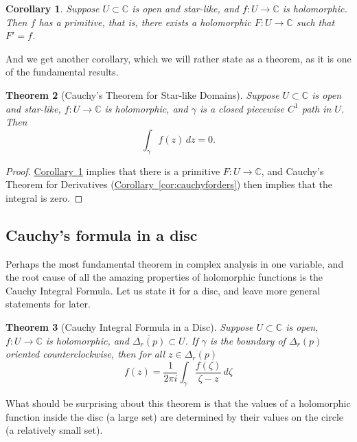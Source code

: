\documentclass[12pt,openany]{book}
\newcommand{\C}{{\mathbb{C}}}
\theoremstyle{plain}
\newtheorem{thm}{Theorem}[section]
\newtheorem{cor}[thm]{Corollary}
\theoremstyle{remark}
\theoremstyle{definition}
\theoremstyle{exercise}
\theoremstyle{example}
\newcommand{\corref}[1]{\hyperref[#1]{Corollary~\ref*{#1}}}
\begin{document}
\begin{cor} \label{cor:primitiveinstarlike}
Suppose $U \subset \C$ is open and star-like,
and $f \colon U \to \C$ is holomorphic.
Then $f$ has a primitive, that is,
there exists a holomorphic $F \colon U \to \C$
such that $F' = f$.
\end{cor}

And we get another corollary, which we will rather state
as a theorem, as it is one of the fundamental results.

\begin{thm}[Cauchy's Theorem for Star-like Domains]
Suppose $U \subset \C$ is open and star-like, $f \colon U \to \C$ is holomorphic,
and $\gamma$ is a closed piecewise $C^1$ path in $U$.  Then
\begin{equation*}
\int_{\gamma} f(z) \, dz = 0 .
\end{equation*}
\end{thm}

\begin{proof}
\corref{cor:primitiveinstarlike} implies that there is
a primitive $F \colon U \to \C$, and
Cauchy's Theorem for Derivatives (\corref{cor:cauchyforders}) then implies that the integral is zero.
\end{proof}

\subsection{Cauchy's formula in a disc}

Perhaps the most fundamental theorem in complex analysis in one variable,
and the root cause of all the amazing properties of holomorphic functions
is the Cauchy Integral Formula.  Let us state it for a disc, and leave
more general statements for later.

\begin{thm}[Cauchy Integral Formula in a Disc]
Suppose $U \subset \C$ is open, $f \colon U \to \C$ is holomorphic,
and $\overline{\Delta_r(p)} \subset U$.
If $\gamma$ is the boundary of $\Delta_r(p)$ oriented counterclockwise,
then for all $z \in \Delta_r(p)$
\begin{equation*}
f(z)
=
\frac{1}{2\pi i}
\int_{\gamma}
\frac{f(\zeta)}{\zeta-z}
\,
d \zeta
\end{equation*}
\end{thm}

What should be surprising about this theorem is that the values of a
holomorphic function inside the disc (a large set) are determined by their
values on the circle (a relatively small set).
\end{document}
